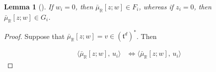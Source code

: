 \documentclass{article}
\newtheorem{lemma}[theorem]{Lemma}
\newcommand{\RR}{\mathbb{R}}
\newcommand{\mft}{\mathfrak{t}}
\begin{document}
	\begin{lemma}[\cite{Proudfoot2004}]
		If $w_{i} = 0$, then $\bar{\mu}_{\RR}[z;w] \in F_{i}$, whereas if $z_{i} = 0$, then $\bar{\mu}_{\RR}[z;w] \in G_{i}$.
	\end{lemma}

	\begin{proof}
		Suppose that $\bar{\mu}_{\RR}[z;w] = v \in (\mft^{d})^{\ast}$. Then 
		
		\[
			\begin{split}
				\langle \bar{\mu}_{\RR}[z;w],\, u_{i} \rangle &\iff \langle \bar{\mu}_{\RR}[z;w],\, u_{i} \rangle
			\end{split}
		\]
		
	\end{proof}
	
	
	
	  
	
	
\end{document}
